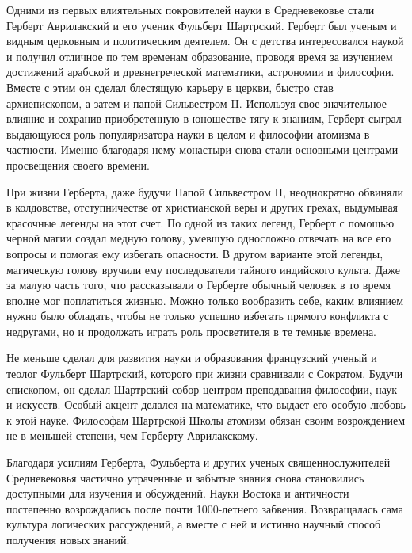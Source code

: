 Одними из первых влиятельных покровителей науки в Средневековье стали Герберт Аврилакский и его ученик Фульберт Шартрский.
Герберт был ученым и видным церковным и политическим деятелем.
Он с детства интересовался наукой и получил отличное по тем временам образование, проводя время за изучением достижений арабской и древнегреческой математики, астрономии и философии.
Вместе с этим он сделал блестящую карьеру в церкви, быстро став архиепископом, а затем и папой Сильвестром II.
Используя свое значительное влияние и сохранив приобретенную в юношестве тягу к знаниям, Герберт сыграл выдающуюся роль популяризатора науки в целом и философии атомизма в частности.
Именно благодаря нему монастыри снова стали основными центрами просвещения своего времени.

При жизни Герберта, даже будучи Папой Сильвестром II, неоднократно обвиняли в колдовстве, отступничестве от христианской веры и других грехах, выдумывая красочные легенды на этот счет.
По одной из таких легенд, Герберт с помощью черной магии создал медную голову, умевшую односложно отвечать на все его вопросы и помогая ему избегать опасности.
В другом варианте этой легенды, магическую голову вручили ему последователи тайного индийского культа.
Даже за малую часть того, что рассказывали о Герберте обычный человек в то время вполне мог поплатиться жизнью.
Можно только вообразить себе, каким влиянием нужно было обладать, чтобы не только успешно избегать прямого конфликта с недругами, но и продолжать играть роль просветителя в те темные времена.

Не меньше сделал для развития науки и образования французский ученый и теолог Фульберт Шартрский, которого при жизни сравнивали с Сократом.
Будучи епископом, он сделал Шартрский собор центром преподавания философии, наук и искусств.
Особый акцент делался на математике, что выдает его особую любовь к этой науке.
Философам Шартрской Школы атомизм обязан своим возрождением не в меньшей степени, чем Герберту Аврилакскому.

Благодаря усилиям Герберта, Фульберта и других ученых священнослужителей Средневековья частично утраченные и забытые знания снова становились доступными для изучения и обсуждений.
Науки Востока и античности постепенно возрождались после почти 1000-летнего забвения.
Возвращалась сама культура логических рассуждений, а вместе с ней и истинно научный способ получения новых знаний.

